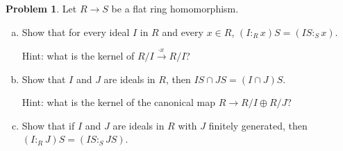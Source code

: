 \documentclass[11pt]{article}
\theoremstyle{definition}
\newtheorem{problem}{Problem}
\begin{document}
\begin{problem}
	Let $R \to S$ be a flat ring homomorphism.
	\begin{enumerate}[a)]
		\item Show that for every ideal $I$ in $R$ and every $x \in R$, $(I :_R x) S = (IS :_S x)$. 
		
	Hint: what is the kernel of $R/I \xrightarrow{\cdot x \, } R/I$?
		
		\item Show that $I$ and $J$ are ideals in $R$, then $IS \cap JS = (I \cap J)S$.
		
	Hint: what is the kernel of the canonical map $R \to R/I \oplus R/J$?	
		
		\item Show that if $I$ and $J$ are ideals in $R$ with $J$ finitely generated, then $(I :_R J)S = (IS :_S JS)$.
		
	\end{enumerate}
\end{problem}

%
\end{document}

